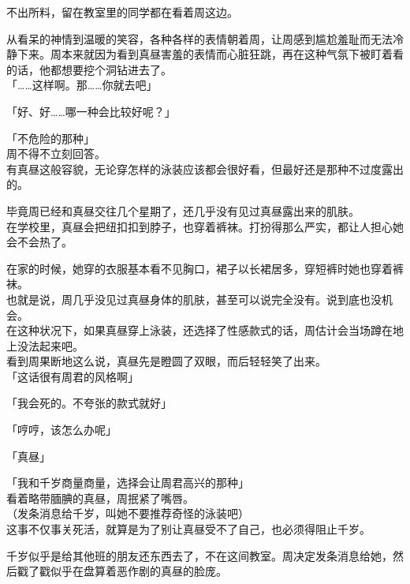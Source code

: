 不出所料，留在教室里的同学都在看着周这边。

从看呆的神情到温暖的笑容，各种各样的表情朝着周，让周感到尴尬羞耻而无法冷静下来。周本来就因为看到真昼害羞的表情而心脏狂跳，再在这种气氛下被盯着看的话，他都想要挖个洞钻进去了。\\

「……这样啊。那……你就去吧」

「好、好……哪一种会比较好呢？」

「不危险的那种」\\

周不得不立刻回答。\\

有真昼这般容貌，无论穿怎样的泳装应该都会很好看，但最好还是那种不过度露出的。

毕竟周已经和真昼交往几个星期了，还几乎没有见过真昼露出来的肌肤。\\

在学校里，真昼会把纽扣扣到脖子，也穿着裤袜。打扮得那么严实，都让人担心她会不会热了。

在家的时候，她穿的衣服基本看不见胸口，裙子以长裙居多，穿短裤时她也穿着裤袜。\\

也就是说，周几乎没见过真昼身体的肌肤，甚至可以说完全没有。说到底也没机会。\\

在这种状况下，如果真昼穿上泳装，还选择了性感款式的话，周估计会当场蹲在地上没法起来吧。\\

看到周果断地这么说，真昼先是瞪圆了双眼，而后轻轻笑了出来。\\

「这话很有周君的风格啊」

「我会死的。不夸张的款式就好」

「哼哼，该怎么办呢」

「真昼」

「我和千岁商量商量，选择会让周君高兴的那种」\\

看着略带腼腆的真昼，周抿紧了嘴唇。\\

（发条消息给千岁，叫她不要推荐奇怪的泳装吧）\\

这事不仅事关死活，就算是为了别让真昼受不了自己，也必须得阻止千岁。

千岁似乎是给其他班的朋友还东西去了，不在这间教室。周决定发条消息给她，然后戳了戳似乎在盘算着恶作剧的真昼的脸庞。
